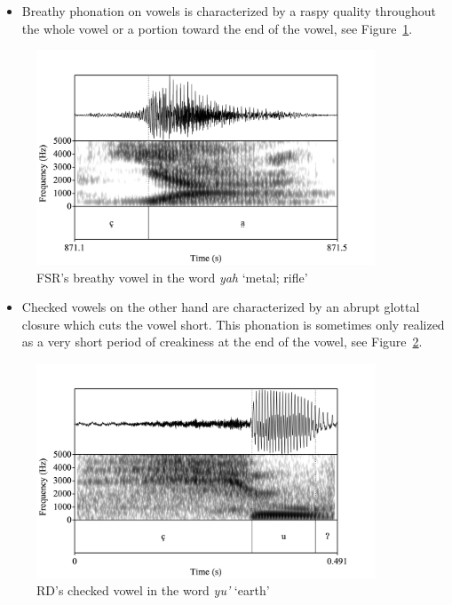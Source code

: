 \documentclass[12pt, letterpaper]{article}
\begin{document}
\begin{itemize}
	\item Breathy phonation on vowels is characterized by a raspy quality throughout the whole vowel or a portion toward the end of the vowel, see Figure~\ref{fig:BreathyVowel}. 
\end{itemize}
\vspace{-4ex}
\begin{figure}[!h]
	\centering
	\includegraphics[width=0.9\textwidth]{../yah.png}
	\caption{FSR's breathy vowel in the word \textit{yah} `metal; rifle'}
	\label{fig:BreathyVowel}
\end{figure}

\begin{itemize}
	\item Checked vowels on the other hand are characterized by an abrupt glottal closure which cuts the vowel short. This phonation is sometimes only realized as a very short period of creakiness at the end of the vowel, see Figure~\ref{fig:CheckedVowel}.  
\end{itemize}
\vspace{-4ex}
\begin{figure}[!h]
	\centering
	\includegraphics[width=0.9\textwidth]{../RD_yu'.png}
	\caption{RD's checked vowel in the word \textit{yu'} `earth'}
	\label{fig:CheckedVowel}
\end{figure}
\end{document}
